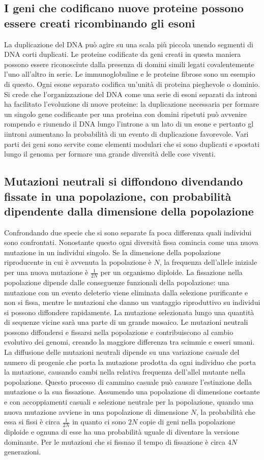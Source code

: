 \subsection{I geni che codificano nuove proteine possono essere creati ricombinando gli esoni}
La duplicazione del DNA pu\`o agire su una scala pi\`u piccola unendo segmenti di DNA corti duplicati. Le proteine codificate da geni creati in questa maniera possono essere riconosciute
dalla presenza di domini simili legati covalentemente l'uno all'altro in serie. Le immunoglobuline e le proteine fibrose sono un esempio di questo. Ogni esone separato codifica 
un'unit\`a di proteina pieghevole o dominio. Si crede che l'organizzazione del DNA come una serie di esoni separati da introni ha facilitato l'evoluzione di nuove proteine: la 
duplicazione necessaria per formare un singolo gene codificante per una proteina con domini ripetuti pu\`o avvenire rompendo e riunendo il DNA lungo l'introne a un lato di un esone e 
pertanto gl iintroni aumentano la probabilit\`a di un evento di duplicazione favorevole. Vari parti dei geni sono servite come elementi modulari che si sono duplicati e spostati lungo il
genoma per formare una grande diversit\`a delle cose viventi. 
\subsection{Mutazioni neutrali si diffondono divendando fissate in una popolazione, con probabilit\`a dipendente dalla dimensione della popolazione}
Confrondando due specie che si sono separate fa poca differenza quali individui sono confrontati. Nonostante questo ogni diversit\`a fissa comincia come una nuova mutazione in un 
individui singolo. Se la dimensione della popolazione riproducente in cui \`e avvenuta la popolazione \`e $N$, la frequenza dell'allele iniziale per una nuova mutazione \`e 
$\frac{1}{2N}$ per un organismo diploide. La fissazione nella popolazione dipende dalle conseguenze funzionali della popolazione: una mutazione con un evento deleterio viene eliminata
dalla selezione purificante e non si fissa, mentre le mutazioni che danno un vantaggio riproduttivo su individui si possono diffondere rapidamente. La mutazione selezionata lungo una 
quantit\`a di sequenze vicine sar\`a una parte di un grande mosaico. Le mutazioni neutrali possono diffondersi e fissarsi nella popolazione e contribuiscono al cambio evolutivo dei 
genomi, creando la maggiore differenza tra scimmie e esseri umani. La diffusione delle mutazioni neutrali dipende su una variazione casuale del numero di progenie che porta la mutazione
prodotta da ogni individuo che porta la mutazione, causando cambi nella relativa frequenza dell'allel mutante nella popolazione. Questo processo di cammino casuale pu\`o causare 
l'estinzione della mutazione o la sua fissazione. Assumendo una popolazione di dimensione costante e con accoppiamenti casuali e selezione neutrale per la popolazione, quando una nuova
mutazione avviene in una popolazione di dimensione $N$, la probabilit\`a che essa si fissi \`e circa $\frac{1}{2N}$ in quanto ci sono $2N$ copie di geni nella popolazione diploide e 
ognuna di esse ha una probabilit\`a uguale di diventare la versione dominante. Per le mutazioni che si fissnao il tempo di fissazione \`e circa $4N$ generazioni. 
